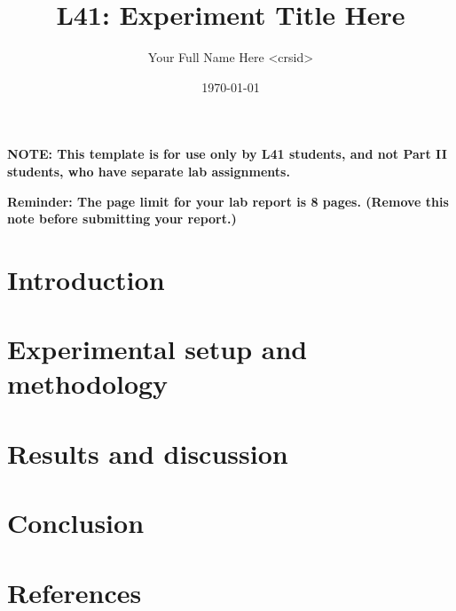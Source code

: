 \documentclass[a4paper,10pt]{article}
\begin{document}
\title{L41: Experiment Title Here}
\author{Your Full Name Here \textless{}crsid\textgreater{}}
\date{\today}

\maketitle

\noindent
\textbf{NOTE: This template is for use only by L41 students, and not Part II
  students, who have separate lab assignments.}

\noindent
\textbf{Reminder: The page limit for your lab report is 8 pages.
  (Remove this note before submitting your report.)}

\section{Introduction}

\section{Experimental setup and methodology}

\section{Results and discussion}

\section{Conclusion}

\section{References}


\end{document}
